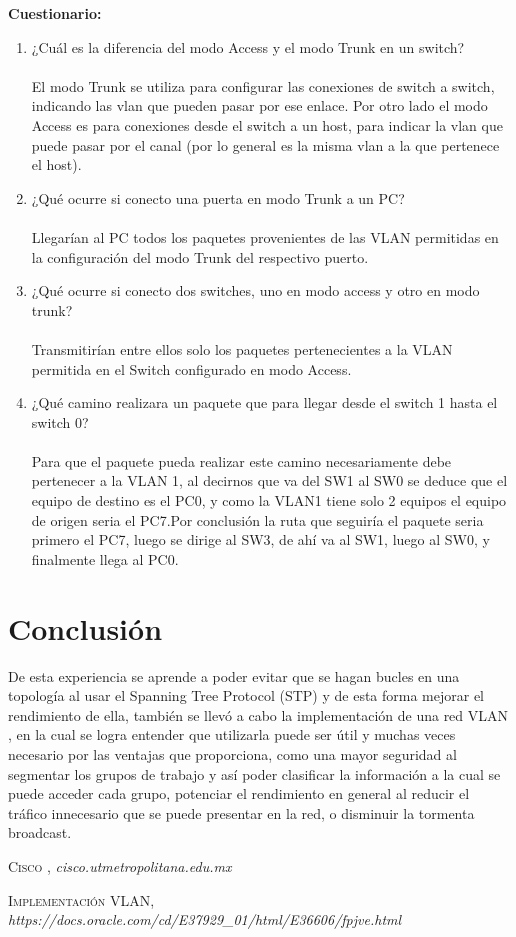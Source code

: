 \documentclass{udpreport}
\begin{document}
	
	{\large \bf{Cuestionario: }}\\
	\begin{enumerate}
	    \item ¿Cuál es la diferencia del modo Access y el modo Trunk en un switch?\\\\
	         El modo Trunk se utiliza para configurar las conexiones de switch a switch, indicando las vlan que pueden pasar por ese enlace. Por otro lado el modo Access es para conexiones desde el switch a un host, para indicar la vlan que puede pasar por el canal (por lo general es la misma vlan a la que pertenece el host).
        \item  ¿Qué ocurre si conecto una puerta en modo Trunk a un PC?\\\\
            Llegarían al PC todos los paquetes provenientes de las VLAN permitidas en la configuración del modo Trunk del respectivo puerto.
        \item ¿Qué ocurre si conecto dos switches, uno en modo access y otro en modo trunk?\\\\
              Transmitirían entre ellos solo los paquetes pertenecientes a la VLAN 
  	      permitida en el Switch configurado en modo Access.
  	     \item  ¿Qué camino realizara un paquete que para llegar desde el switch 1 hasta el switch 0?\\\\
  	       Para que el paquete pueda realizar este camino necesariamente debe pertenecer a la VLAN 1, al decirnos que va del SW1 al SW0 se deduce que el equipo de destino es el PC0, y como la VLAN1 tiene solo 2 equipos el equipo de origen seria el PC7.Por conclusión la ruta que seguiría el paquete seria primero el PC7, luego se dirige al SW3, de ahí va al SW1, luego al SW0, y finalmente llega al PC0.
  	     
	\end{enumerate}
\chapter{Conclusión}
 De esta experiencia se aprende a poder evitar que se hagan bucles en una topología al usar el Spanning Tree Protocol (STP) y de esta forma mejorar el rendimiento de ella, también se llevó a cabo la implementación de una red VLAN , en la cual  se logra  entender que  utilizarla puede ser útil y muchas veces necesario por las ventajas que proporciona, como una mayor seguridad al segmentar los grupos de trabajo y así poder clasificar la información a la cual se puede acceder cada grupo, potenciar el rendimiento en general al reducir el tráfico innecesario que se puede presentar en la red, o disminuir la tormenta broadcast.\\
\begin{thebibliography}{x}
 \textsc{Cisco },
\textit{cisco.utmetropolitana.edu.mx}

 \textsc{Implementación VLAN},
\textit{https://docs.oracle.com/cd/E37929_01/html/E36606/fpjve.html}

\end{thebibliography}
\end{document}

